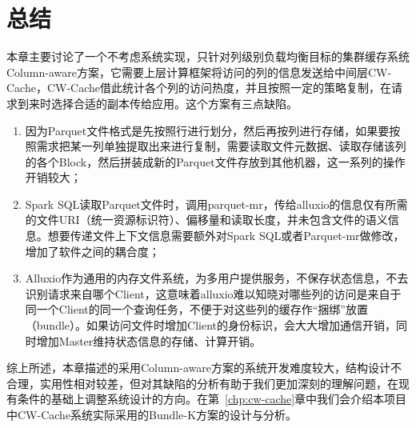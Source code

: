 \section{总结}

\par 本章主要讨论了一个不考虑系统实现，只针对列级别负载均衡目标的集群缓存系统Column-aware方案，它需要上层计算框架将访问的列的信息发送给中间层CW-Cache，CW-Cache借此统计各个列的访问热度，并且按照一定的策略复制，在请求到来时选择合适的副本传给应用。这个方案有三点缺陷。

\begin{enumerate}
    \item 因为Parquet文件格式是先按照行进行划分，然后再按列进行存储，如果要按照需求把某一列单独提取出来进行复制，需要读取文件元数据、读取存储该列的各个Block，然后拼装成新的Parquet文件存放到其他机器，这一系列的操作开销较大；
    \item Spark SQL读取Parquet文件时，调用parquet-mr，传给alluxio的信息仅有所需的文件URI（统一资源标识符）、偏移量和读取长度，并未包含文件的语义信息。想要传递文件上下文信息需要额外对Spark SQL或者Parquet-mr做修改，增加了软件之间的耦合度；
    \item Alluxio作为通用的内存文件系统，为多用户提供服务，不保存状态信息，不去识别请求来自哪个Client，这意味着alluxio难以知晓对哪些列的访问是来自于同一个Client的同一个查询任务，不便于对这些列的缓存作“捆绑”放置（bundle）。如果访问文件时增加Client的身份标识，会大大增加通信开销，同时增加Master维持状态信息的存储、计算开销。
\end{enumerate}

\par 综上所述，本章描述的采用Column-aware方案的系统开发难度较大，结构设计不合理，实用性相对较差，但对其缺陷的分析有助于我们更加深刻的理解问题，在现有条件的基础上调整系统设计的方向。在第~\ref{chp:cw-cache}章中我们会介绍本项目中CW-Cache系统实际采用的Bundle-K方案的设计与分析。